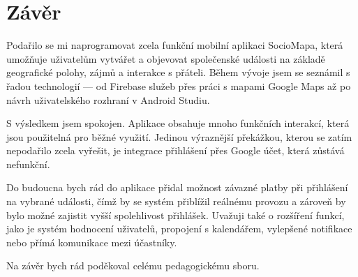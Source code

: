 \chapter{Závěr}

Podařilo se mi naprogramovat zcela funkční mobilní aplikaci SocioMapa, která umožňuje uživatelům vytvářet a objevovat společenské události na základě geografické polohy, zájmů a interakce s přáteli. Během vývoje jsem se seznámil s řadou technologií — od Firebase služeb přes práci s mapami Google Maps až po návrh uživatelského rozhraní v Android Studiu.

S výsledkem jsem spokojen. Aplikace obsahuje mnoho funkčních interakcí, která jsou použitelná pro běžné využití. Jedinou výraznější překážkou, kterou se zatím nepodařilo zcela vyřešit, je integrace přihlášení přes Google účet, která zůstává nefunkční. 

Do budoucna bych rád do aplikace přidal možnost závazné platby při přihlášení na vybrané události, čímž by se systém přiblížil reálnému provozu a zároveň by bylo možné zajistit vyšší spolehlivost přihlášek. Uvažuji také o rozšíření funkcí, jako je systém hodnocení uživatelů, propojení s kalendářem, vylepšené notifikace nebo přímá komunikace mezi účastníky.

Na závěr bych rád poděkoval celému pedagogickému sboru.